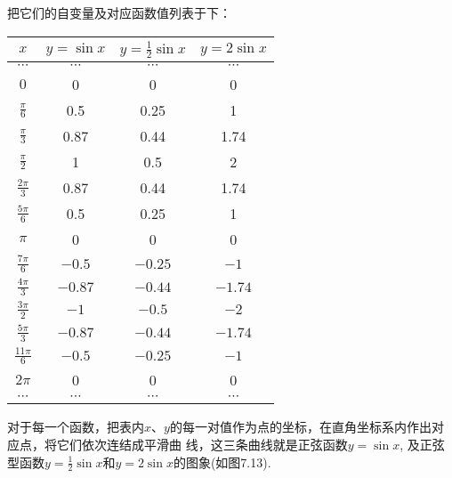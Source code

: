 把它们的自变量及对应函数值列表于下：
\begin{center}
\begin{tabular}{cccc}
    \hline
$x$ & $y=\sin x$ & $y=\tfrac{1}{2}\sin x$ & $y=2\sin x$\\
\hline
$\cdots$ & $\cdots$&$\cdots$&$\cdots$\\
$0$   &    0   &   0 &  0\\
$\tfrac{\pi}{6}$   &    0.5   &   0.25 &  1\\
$\tfrac{\pi}{3}$   &    0.87   &   0.44 &  1.74\\
$\tfrac{\pi}{2}$   &    1   &   0.5 &  2\\
$\tfrac{2\pi}{3}$   &    0.87   &   0.44 &  1.74\\
$\tfrac{5\pi}{6}$   &    0.5   &   0.25 &  1\\
$\pi$   &    0   &   0 &  0\\
$\tfrac{7\pi}{6}$   &    $-0.5$   &   $-0.25$ &  $-1$\\
$\tfrac{4\pi}{3}$   &    $-0.87$   &   $-0.44$ &  $-1.74$\\
$\tfrac{3\pi}{2}$   &    $-1$   &   $-0.5$ &  $-2$\\
$\tfrac{5\pi}{3}$   &    $-0.87$   &   $-0.44$ &  $-1.74$\\
$\tfrac{11\pi}{6}$   &    $-0.5$   &   $-0.25$ &  $-1$\\
$2\pi$   &    0   &   0 &  0\\
$\cdots$ & $\cdots$&$\cdots$&$\cdots$\\
\hline
\end{tabular}
\end{center}

对于每一个函数，把表内$x$、$y$的每一对值作为点的坐标，在直角坐标系内作出对应点，将它们依次连结成平滑曲
线，这三条曲线就是正弦函数$y=\sin x$, 及正弦型函数$y=\frac{1}{2}\sin x$和$y=2\sin x$的图象(如图7.13).

\begin{figure}[htp]
    \centering
{}
    \caption{}
\end{figure}


